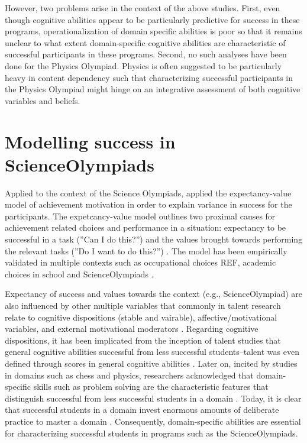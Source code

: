 \documentclass[../main/TaylorFrancis/interactapasample]{subfiles}
\begin{document}
However, two problems arise in the context of the above studies. First, even though cognitive abilities appear to be particularly predictive for success in these programs, operationalization of domain specific abilities is poor so that it remains unclear to what extent domain-specific cognitive abilities are characteristic of successful participants in these programs. Second, no such analyses have been done for the Physics Olympiad. Physics is often suggested to be particularly heavy in content dependency such that characterizing successful participants in the Physics Olympiad might hinge on an integrative assessment of both cognitive variables and beliefs.


\section{Modelling success in ScienceOlympiads}

Applied to the context of the Science Olympiads, \cite{Urhahne.2012} applied the expectancy-value model of achievement motivation in order to explain variance in success for the participants. The expetcancy-value model outlines two proximal causes for achievement related choices and performance in a situation: expectancy to be successful in a task (''Can I do this?'') and the values brought towards performing the relevant tasks (''Do I want to do this?'') \citep{Eccles.1983}. The model has been empirically validated in multiple contexts such as occupational choices REF, academic choices in school \citep{Koller.2000} and ScienceOlympiads \citep{Urhahne.2012}. 

Expectancy of success and values towards the context (e.g., ScienceOlympiad) are also influenced by other multiple variables that commonly in talent research relate to cognitive dispositions (stable and vairable), affective/motivational variables, and external motivational moderators \citep[e.g.,][]{Ziegler.2009,Heller.2002}. Regarding cognitive dispositions, it has been implicated from the inception of talent studies that general cognitive abilities successful from less successful students--talent was even defined through scores in general cognitive abilities \citep{Rost.2010}. Later on, incited by studies in domains such as chess and physics, researchers acknowledged that domain-specific skills such as problem solving are the characteristic features that distinguish successful from less successful students in a domain \citep{Chi.1981}. Today, it is clear that successful students in a domain invest enormous amounts of deliberate practice to master a domain \citep{Simon.1983}. Consequently, domain-specific abilities are essential for characterizing successful students in programs such as the ScienceOlympiads. 
\end{document}
